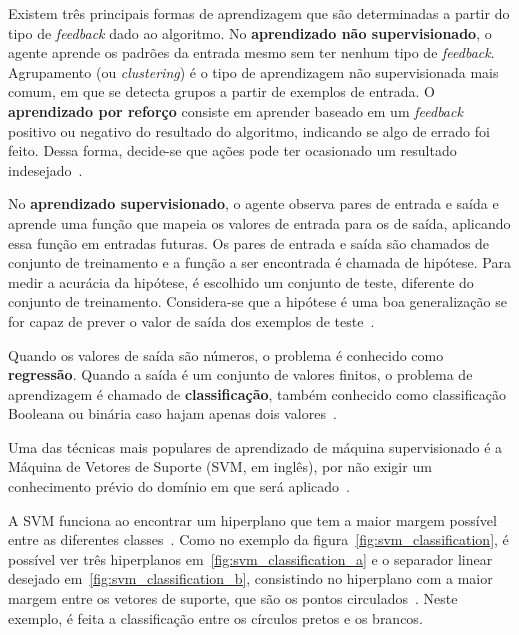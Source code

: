 Existem três principais formas de aprendizagem que são determinadas a partir do tipo de \textit{feedback} dado ao algoritmo. No \textbf{aprendizado não supervisionado}, o agente aprende os padrões da entrada mesmo sem ter nenhum tipo de \textit{feedback}. Agrupamento (ou \textit{clustering}) é o tipo de aprendizagem não supervisionada mais comum, em que se detecta grupos a partir de exemplos de entrada. O \textbf{aprendizado por reforço} consiste em aprender baseado em um \textit{feedback} positivo ou negativo do resultado do algoritmo, indicando se algo de errado foi feito. Dessa forma, decide-se que ações pode ter ocasionado um resultado indesejado~\cite{russell:2010}.

No \textbf{aprendizado supervisionado}, o agente observa pares de entrada e saída e aprende uma função que mapeia os valores de entrada para os de saída, aplicando essa função em entradas futuras. Os pares de entrada e saída são chamados de conjunto de treinamento e a função a ser encontrada é chamada de hipótese. Para medir a acurácia da hipótese, é escolhido um conjunto de teste, diferente do conjunto de treinamento. Considera-se que a hipótese é uma boa generalização se for capaz de prever o valor de saída dos exemplos de teste~\cite{russell:2010}.

Quando os valores de saída são números, o problema é conhecido como \textbf{regressão}. Quando a saída é um conjunto de valores finitos, o problema de aprendizagem é chamado de \textbf{classificação}, também conhecido como classificação Booleana ou binária caso hajam apenas dois valores~\cite{russell:2010}.

Uma das técnicas mais populares de aprendizado de máquina supervisionado é a Máquina de Vetores de Suporte (SVM, em inglês), por não exigir um conhecimento prévio do domínio em que será aplicado~\cite{russell:2010}.

A SVM funciona ao encontrar um hiperplano que tem a maior margem possível entre as diferentes classes~\cite{hearst:1998}. Como no exemplo da figura~\ref{fig:svm_classification}, é possível ver três hiperplanos em~\ref{fig:svm_classification_a} e o separador linear desejado em~\ref{fig:svm_classification_b}, consistindo no hiperplano com a maior margem entre os vetores de suporte, que são os pontos circulados~\cite{russell:2010}. Neste exemplo, é feita a classificação entre os círculos pretos e os brancos.

